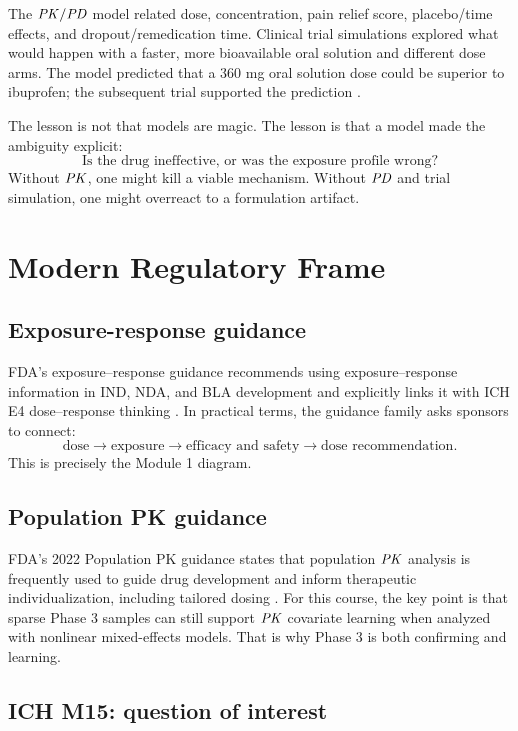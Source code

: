 \documentclass[a4paper]{article}
\newcommand{\PK}{\ensuremath{\pksym{PK}}}
\newcommand{\PD}{\ensuremath{\pksym{PD}}}
\newcommand{\PKPD}{\ensuremath{\pksym{PK}/\pksym{PD}}}
\begin{document}
The \PKPD{} model related dose, concentration, pain relief score, placebo/time effects, and dropout/remedication time. Clinical trial simulations explored what would happen with a faster, more bioavailable oral solution and different dose arms. The model predicted that a 360 mg oral solution dose could be superior to ibuprofen; the subsequent trial supported the prediction \cite{kowalski2008sc75416}.

The lesson is not that models are magic. The lesson is that a model made the ambiguity explicit:
\[
  \text{Is the drug ineffective, or was the exposure profile wrong?}
\]
Without \PK, one might kill a viable mechanism. Without \PD{} and trial simulation, one might overreact to a formulation artifact.

\section{Modern Regulatory Frame}

\subsection{Exposure-response guidance}

FDA's exposure--response guidance recommends using exposure--response information in IND, NDA, and BLA development and explicitly links it with ICH E4 dose--response thinking \cite{fda2003exposureResponse}. In practical terms, the guidance family asks sponsors to connect:
\[
  \text{dose}
  \rightarrow
  \text{exposure}
  \rightarrow
  \text{efficacy and safety}
  \rightarrow
  \text{dose recommendation}.
\]
This is precisely the Module 1 diagram.

\subsection{Population PK guidance}

FDA's 2022 Population PK guidance states that population \PK{} analysis is frequently used to guide drug development and inform therapeutic individualization, including tailored dosing \cite{fda2022populationPK}. For this course, the key point is that sparse Phase 3 samples can still support \PK{} covariate learning when analyzed with nonlinear mixed-effects models. That is why Phase 3 is both confirming and learning.

\subsection{ICH M15: question of interest}
\end{document}
